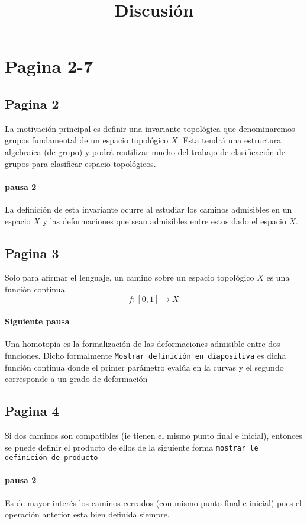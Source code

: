 \documentclass[letterpaper]{article}
\begin{document}
\title{Discusión}

\section*{Pagina 2-7}
\subsection*{Pagina 2}
La motivación principal es definir una invariante topológica que
denominaremos grupos fundamental de un espacio topológico \(X\). Esta
tendrá una estructura algebraica (de grupo) y podrá reutilizar mucho del
trabajo de clasificación de grupos para clasificar espacio topológicos.

\paragraph{pausa 2}
La definición de esta invariante ocurre al estudiar los caminos
admisibles en un espacio \(X\) y las deformaciones que sean admisibles
entre estos dado el espacio \(X\).

\subsection*{Pagina 3}
Solo para afirmar el lenguaje, un camino sobre un espacio topológico
\(X\) es una función continua
\[ f : [0,1] \to X \]

\paragraph{Siguiente pausa}
Una homotopía es la formalización de las deformaciones admisible entre
dos funciones. Dicho formalmente \texttt{Mostrar definición en
  diapositiva} es dicha función continua donde el primer parámetro
evalúa en la curvas y el segundo corresponde a un grado de deformación

\subsection*{Pagina 4}
Si dos caminos son compatibles (ie tienen el mismo punto final e
inicial), entonces se puede definir el producto de ellos de la siguiente
forma \texttt{mostrar le definición de producto}

\paragraph{pausa 2}
Es de mayor interés los caminos cerrados (con mismo punto final e
inicial) pues el operación anterior esta bien definida siempre.
\end{document}
